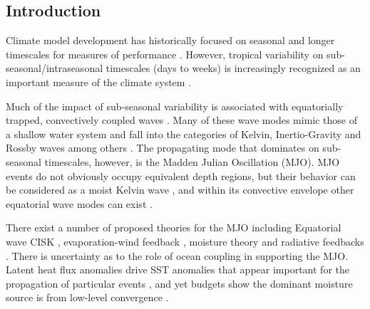 \documentclass[draft,ms]{AGUTeX}
\begin{document}
%
%

%
\begin{article}
%
%

\section{Introduction}
\label{sec:intro}
Climate model development has historically focused on seasonal and longer timescales for measures of performance \citep{Gent2011,Li2014}. However, tropical variability on sub-seasonal/intraseasonal timescales (days to weeks) is increasingly recognized as an important measure of the climate system \citep{Lin2006,Ahn2017}. 

Much of the impact of sub-seasonal variability is associated with equatorially trapped, convectively coupled waves \citep{Wheeler1999}. Many of these wave modes mimic those of a shallow water system and fall into the categories of Kelvin, Inertio-Gravity and Rossby waves among others \citep{Matsuno1966}. The propagating mode that dominates on sub-seasonal timescales, however, is the Madden Julian Oscillation (MJO). MJO events do not obviously occupy equivalent depth regions, but their behavior can be considered as a moist Kelvin wave \citep{Roundy2012}, and within its convective envelope other equatorial wave modes can exist \citep{Kikuchi2010}.

There exist a number of proposed theories for the MJO including Equatorial wave CISK \citep{Hayashi1970,Benedict2007}, evaporation-wind feedback \citep{Neelin1987}, moisture theory \citep{Adames2016,Sobel2013} and radiative feedbacks \citep{Kim2015}. There is uncertainty as to the role of ocean coupling in supporting the MJO. Latent heat flux anomalies drive SST anomalies that appear important for the propagation of particular events \citep{Krishnamurti1988}, and yet budgets show the dominant moisture source is from low-level convergence \citep{DeSzoeke2015}.


\end{article}
\end{document}
